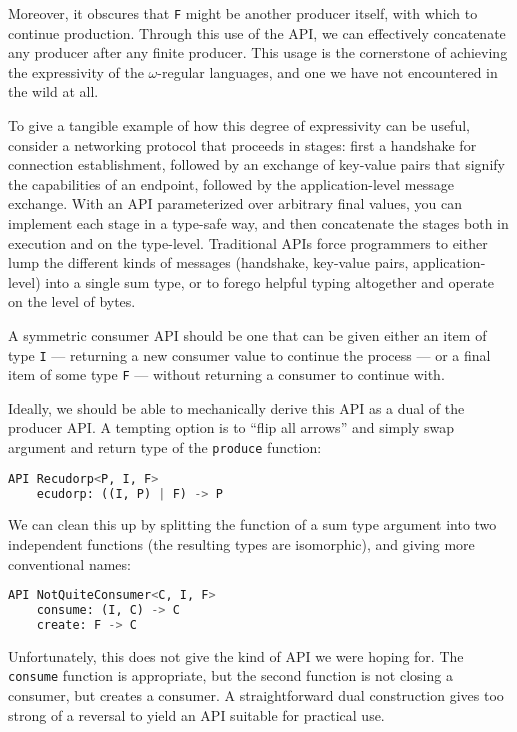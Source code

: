 \documentclass[sigplan,screen,10pt,review]{acmart}
\begin{document}
Moreover, it obscures that \texttt{F} might be another producer itself, with which to continue production. Through this use of the API, we can effectively concatenate any producer after any finite producer. This usage is the cornerstone of achieving the expressivity of the $\omega$-regular languages, and one we have not encountered in the wild at all.

To give a tangible example of how this degree of expressivity can be useful, consider a networking protocol that proceeds in stages: first a handshake for connection establishment, followed by an exchange of key-value pairs that signify the capabilities of an endpoint, followed by the application-level message exchange. With an API parameterized over arbitrary final values, you can implement each stage in a type-safe way, and then concatenate the stages both in execution and on the type-level. Traditional APIs force programmers to either lump the different kinds of messages (handshake, key-value pairs, application-level) into a single sum type, or to forego helpful typing altogether and operate on the level of bytes.

A symmetric consumer API should be one that can be given either an item of type \texttt{I} --- returning a new consumer value to continue the process --- or a final item of some type \texttt{F} --- without returning a consumer to continue with.

Ideally, we should be able to mechanically derive this API as a dual of the producer API. A tempting option is to ``flip all arrows'' and simply swap argument and return type of the \texttt{produce} function:

\begin{lstlisting}[language=Python]
API Recudorp<P, I, F>
    ecudorp: ((I, P) | F) -> P
\end{lstlisting}

We can clean this up by splitting the function of a sum type argument into two independent functions (the resulting types are isomorphic), and giving more conventional names:

\begin{lstlisting}[language=Python]
API NotQuiteConsumer<C, I, F>
    consume: (I, C) -> C
    create: F -> C
\end{lstlisting}

Unfortunately, this does not give the kind of API we were hoping for. The \texttt{consume} function is appropriate, but the second function is not closing a consumer, but creates a consumer. A straightforward dual construction gives too strong of a reversal to yield an API suitable for practical use.
\end{document}
